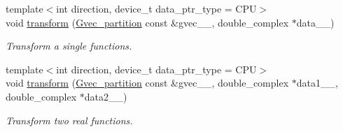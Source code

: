 \begin{DoxyCompactItemize}
\item 
{\footnotesize template$<$int direction, device\+\_\+t data\+\_\+ptr\+\_\+type = C\+P\+U$>$ }\\void \hyperlink{classsddk_1_1_f_f_t3_d_aa26088197ba6556766da73b1d122c1cc}{transform} (\hyperlink{classsddk_1_1_gvec__partition}{Gvec\+\_\+partition} const \&gvec\+\_\+\+\_\+, double\+\_\+complex $\ast$data\+\_\+\+\_\+)
\begin{DoxyCompactList}\small\item\em Transform a single functions. \end{DoxyCompactList}\item 
{\footnotesize template$<$int direction, device\+\_\+t data\+\_\+ptr\+\_\+type = C\+P\+U$>$ }\\void \hyperlink{classsddk_1_1_f_f_t3_d_ae69f2b082376f2d12eff7ca3b1ae1717}{transform} (\hyperlink{classsddk_1_1_gvec__partition}{Gvec\+\_\+partition} const \&gvec\+\_\+\+\_\+, double\+\_\+complex $\ast$data1\+\_\+\+\_\+, double\+\_\+complex $\ast$data2\+\_\+\+\_\+)
\begin{DoxyCompactList}\small\item\em Transform two real functions. \end{DoxyCompactList}\end{DoxyCompactItemize}
